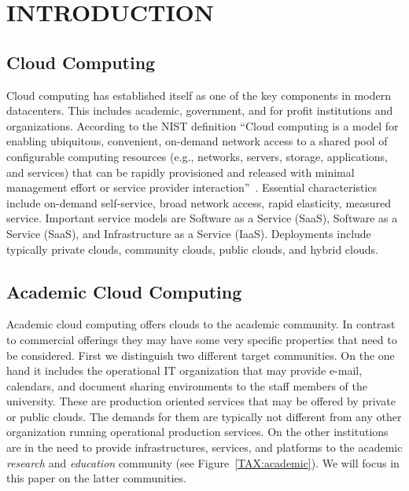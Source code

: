 \documentclass{sig-alternate-05-2015}
\begin{document}

\printccsdesc



\section{INTRODUCTION}

\subsection{Cloud Computing}

Cloud computing has established itself as one of the key components in modern datacenters. This includes academic, government, and for profit institutions and organizations.  According to the NIST definition ``Cloud computing is a model for enabling ubiquitous, convenient, on-demand network access to a shared pool of configurable computing resources (e.g., networks, servers, storage, applications, and services) that can be rapidly provisioned and released with minimal management effort or service provider interaction''~\cite{mell2011nist}. Essential characteristics include on-demand self-service, broad network access, rapid elasticity, measured service. Important service models are Software as a Service (SaaS), Software as a Service (SaaS), and Infrastructure as a Service (IaaS). Deployments include typically private clouds, community clouds, public clouds, and hybrid clouds.

\subsection{Academic Cloud Computing}

Academic cloud computing offers clouds to the academic community. In contrast to commercial offerings they may have some very specific properties that need to be considered. First we distinguish two different target communities. On the one hand it includes the operational IT organization that may provide e-mail, calendars, and document sharing environments to the staff members of the university. These are production oriented services that may be offered by private or public clouds.  The demands for them are typically not different from any other organization running operational production services. On the other institutions are in the need to provide infrastructures, services, and platforms to the academic {\it
  research} and {\it education} community (see
Figure~\ref{TAX:academic}). We will focus in this paper on the latter
communities.
\end{document}
